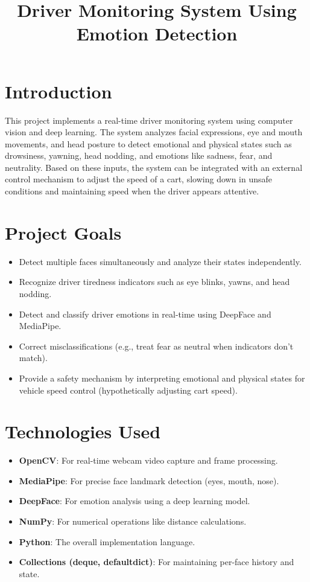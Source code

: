 \documentclass[12pt]{article}
\title{Driver Monitoring System Using Emotion Detection}
\author{}
\date{}
\begin{document}
\maketitle

\section{Introduction}
This project implements a real-time driver monitoring system using computer vision and deep learning. The system analyzes facial expressions, eye and mouth movements, and head posture to detect emotional and physical states such as drowsiness, yawning, head nodding, and emotions like sadness, fear, and neutrality. Based on these inputs, the system can be integrated with an external control mechanism to adjust the speed of a cart, slowing down in unsafe conditions and maintaining speed when the driver appears attentive.

\section{Project Goals}
\begin{itemize}
    \item Detect multiple faces simultaneously and analyze their states independently.
    \item Recognize driver tiredness indicators such as eye blinks, yawns, and head nodding.
    \item Detect and classify driver emotions in real-time using DeepFace and MediaPipe.
    \item Correct misclassifications (e.g., treat fear as neutral when indicators don’t match).
    \item Provide a safety mechanism by interpreting emotional and physical states for vehicle speed control (hypothetically adjusting cart speed).
\end{itemize}

\section{Technologies Used}
\begin{itemize}
    \item \textbf{OpenCV}: For real-time webcam video capture and frame processing.
    \item \textbf{MediaPipe}: For precise face landmark detection (eyes, mouth, nose).
    \item \textbf{DeepFace}: For emotion analysis using a deep learning model.
    \item \textbf{NumPy}: For numerical operations like distance calculations.
    \item \textbf{Python}: The overall implementation language.
    \item \textbf{Collections (deque, defaultdict)}: For maintaining per-face history and state.
\end{itemize}
\end{document}
